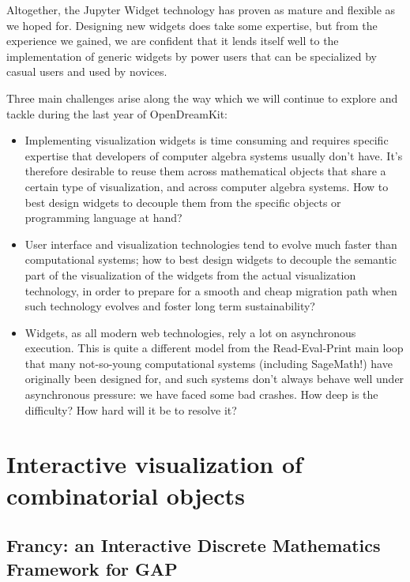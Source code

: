 \documentclass{deliverablereport}
\begin{document}
Altogether, the Jupyter Widget technology has proven as mature and
flexible as we hoped for. Designing new widgets does take some
expertise, but from the experience we gained, we are confident that it
lends itself well to the implementation of generic widgets by power
users that can be specialized by casual users and used by novices.

Three main challenges arise along the way which we will continue to
explore and tackle during the last year of OpenDreamKit:
\begin{itemize}
\item Implementing visualization widgets is time consuming and
  requires specific expertise that developers of computer algebra
  systems usually don't have. It's therefore desirable to reuse them
  across mathematical objects that share a certain type of
  visualization, and across computer algebra systems. How to best
  design widgets to decouple them from the specific objects or
  programming language at hand?
\item User interface and visualization technologies tend to evolve
  much faster than computational systems; how to best design widgets
  to decouple the semantic part of the visualization of the widgets
  from the actual visualization technology, in order to prepare for a
  smooth and cheap migration path when such technology evolves and
  foster long term sustainability?
\item Widgets, as all modern web technologies, rely a lot on
  asynchronous execution. This is quite a different model from the
  Read-Eval-Print main loop that many not-so-young computational
  systems (including SageMath!) have originally been designed for, and
  such systems don't always behave well under asynchronous pressure:
  we have faced some bad crashes. How deep is the difficulty? How hard
  will it be to resolve it?
\end{itemize}


\section{Interactive visualization of combinatorial objects}
\label{section:combi}

\subsection{Francy: an Interactive Discrete Mathematics Framework for GAP}
\label{section:francy}
\end{document}
